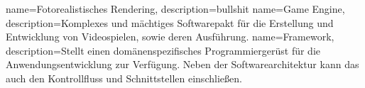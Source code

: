 {
  name=Fotorealistisches Rendering,
  description={bullshit}
}
{
  name=Game Engine,
  description={Komplexes und mächtiges Softwarepakt für die Erstellung und Entwicklung von Videospielen, sowie deren Ausführung.}
}
{
  name=Framework,
  description={Stellt einen domänenspezifisches Programmiergerüst für die Anwendungsentwicklung zur Verfügung. Neben der Softwarearchitektur kann das auch den Kontrollfluss und Schnittstellen einschließen.}
}
